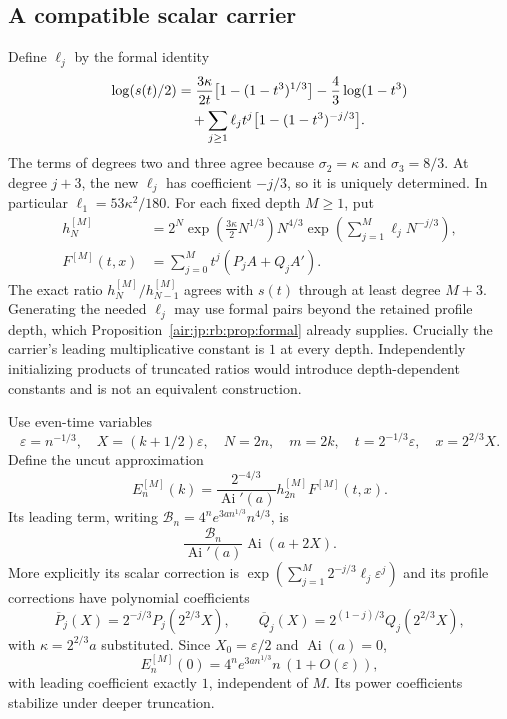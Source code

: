 \documentclass[11pt,letterpaper]{article}
\numberwithin{equation}{section}
\theoremstyle{remark}
\newcommand{\Ai}{\operatorname{Ai}}
\newcommand{\eps}{\varepsilon}
\begin{document}
\subsection{A compatible scalar carrier}
Define $\ell_j$ by the formal identity
\begin{align}
 \log(s(t)/2)
 &=\frac{3\kappa}{2t}\bigl[1-(1-t^3)^{1/3}\bigr]
   -\frac43\log(1-t^3)\notag\\
 &\quad+\sum_{j\ge1}\ell_jt^j\bigl[1-(1-t^3)^{-j/3}\bigr].\label{air:jp:rb:eq:carrieridentity}
\end{align}
The terms of degrees two and three agree because $\sigma_2=\kappa$ and $\sigma_3=8/3$. At degree $j+3$, the new $\ell_j$ has coefficient $-j/3$, so it is uniquely determined. In particular $\ell_1=53\kappa^2/180$.
For each fixed depth $M\ge1$, put
\begin{align}
 h_N^{[M]}&=2^N\exp\!\left(\tfrac{3\kappa}2N^{1/3}\right)N^{4/3}
              \exp\!\left(\sum_{j=1}^M\ell_jN^{-j/3}\right),\label{air:jp:rb:eq:carrier}\\
 F^{[M]}(t,x)&=\sum_{j=0}^Mt^j(P_jA+Q_jA').\label{air:jp:rb:eq:finiteprofile}
\end{align}
The exact ratio $h_N^{[M]}/h_{N-1}^{[M]}$ agrees with $s(t)$ through at least degree $M+3$. Generating the needed $\ell_j$ may use formal pairs beyond the retained profile depth, which Proposition~\ref{air:jp:rb:prop:formal} already supplies.
Crucially the carrier's leading multiplicative constant is $1$ at every depth. Independently initializing products of truncated ratios would introduce depth-dependent constants and is not an equivalent construction.

Use even-time variables
\[
 \eps=n^{-1/3},\quad X=(k+1/2)\eps,\quad
 N=2n,\quad m=2k,\quad t=2^{-1/3}\eps,\quad x=2^{2/3}X.
\]
Define the uncut approximation
\begin{equation}\label{air:jp:rb:eq:Eapprox}
 E_n^{[M]}(k)=\frac{2^{-4/3}}{\Ai'(a)}h_{2n}^{[M]}F^{[M]}(t,x).
\end{equation}
Its leading term, writing
$\mathcal B_n=4^ne^{3an^{1/3}}n^{4/3}$, is
\[
 \frac{\mathcal B_n}{\Ai'(a)}\Ai(a+2X).
\]
More explicitly its scalar correction is $\exp(\sum_{j=1}^M2^{-j/3}\ell_j\eps^j)$ and its profile corrections have polynomial coefficients
\[
 \overline P_j(X)=2^{-j/3}P_j(2^{2/3}X),\qquad
 \overline Q_j(X)=2^{(1-j)/3}Q_j(2^{2/3}X),
\]
with $\kappa=2^{2/3}a$ substituted. Since $X_0=\eps/2$ and $\Ai(a)=0$,
\begin{equation}\label{air:jp:rb:eq:Eendpoint}
 E_n^{[M]}(0)=4^ne^{3an^{1/3}}n\,(1+O(\eps)),
\end{equation}
with leading coefficient exactly $1$, independent of $M$. Its power coefficients stabilize under deeper truncation.
\end{document}
